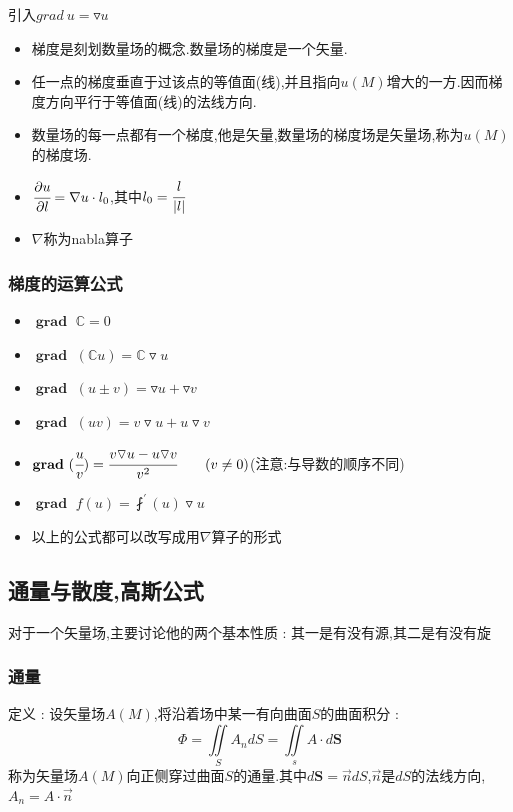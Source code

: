 \documentclass[UTF8,12pt]{ctexbook}
\newcommand{\derivative}{^\prime}
\newcommand{\fDerivative}[1]{\fint\derivative(#1)}
\newcommand{\defFunction}[1]{f(#1)}
\newcommand{\mathConstant}{\mathbb{C}}
\newcommand{\partialDerivativeFrac}[2]{\cfrac{\partial #1}{\partial #2}}
\newcommand{\doubleIntegralOnZone}[1]{\iint\limits_{#1}}
\DeclareMathOperator{\gradText}{\mathbf{grad}\ }
\begin{document}
{{{{{      引入$grad\ u = \triangledown u$

      \begin{itemize}
        \item 梯度是刻划数量场的概念.数量场的梯度是一个矢量.
        \item 任一点的梯度垂直于过该点的等值面(线),并且指向$u(M)$增大的一方.因而梯度方向平行于等值面(线)的法线方向.
        \item 数量场的每一点都有一个梯度,他是矢量,数量场的梯度场是矢量场,称为$u(M)$的梯度场.
        \item $\partialDerivativeFrac{u}{l} = \nabla u \cdot l_0$,其中$l_0= \cfrac{l}{|l|}$
        \item $\nabla$称为nabla算子
      \end{itemize}
    }%

    \subsubsection{梯度的运算公式}{
      \begin{itemize}
        \item $\gradText \mathConstant = 0$
        \item $\gradText (\mathConstant u) = \mathConstant \triangledown u$
        \item $\gradText (u \pm v) = \triangledown u + \triangledown v$
        \item $\gradText (uv) = v\triangledown u + u\triangledown v$
        \item $\gradText (\cfrac{u}{v}) = \cfrac{v\triangledown u - u\triangledown v}{v^2}\qquad (v \neq 0)$(注意:与导数的顺序不同)
        \item $\gradText \defFunction{u} = \fDerivative{u}\triangledown u$
        \item 以上的公式都可以改写成用$\nabla$算子的形式
      \end{itemize}
    }%

  }%

  \subsection{通量与散度,高斯公式}{
    对于一个矢量场,主要讨论他的两个基本性质 : 其一是有没有源,其二是有没有旋

    \subsubsection{通量}{
      定义 : 设矢量场$A(M)$,将沿着场中某一有向曲面$S$的曲面积分 :
      $$
        \varPhi = \doubleIntegralOnZone{S} A_n dS = \doubleIntegralOnZone{s} A \cdot d\mathbf{S}
      $$
      称为矢量场$A(M)$向正侧穿过曲面$S$的通量.其中$d\mathbf{S} = \vec{n}dS$,$\vec{n}$是$dS$的法线方向,$A_n = A \cdot \vec{n}$

}}}}}
\end{document}
